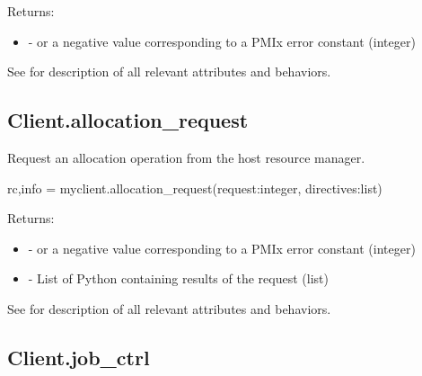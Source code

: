 Returns:

\begin{itemize}
    \item {} -  or a negative value corresponding to a PMIx error constant (integer)
\end{itemize}

See  for description of all relevant attributes and behaviors.


\subsection{Client.allocation_request}

\summary

Request an allocation operation from the host resource manager.

\format

\pyspecificstart
\begin{codepar}
rc,info = myclient.allocation_request(request:integer, directives:list)
\end{codepar}
\pyspecificend

\begin{arglist}
\end{arglist}

Returns:

\begin{itemize}
    \item {} -  or a negative value corresponding to a PMIx error constant (integer)
    \item {} - List of Python  containing results of the request (list)
\end{itemize}

See  for description of all relevant attributes and behaviors.


\subsection{Client.job_ctrl}

